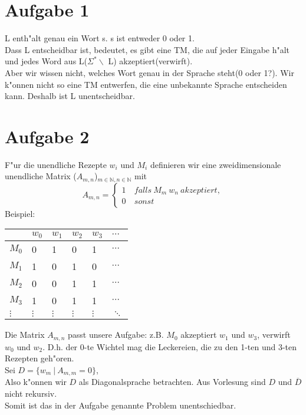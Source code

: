 \documentclass[a4paper,11pt]{scrartcl}
\begin{document}
	
\section*{Aufgabe 1}

L enth"alt genau ein Wort s. s ist entweder 0 oder 1. \\
Dass L entscheidbar ist, bedeutet, es gibt eine TM, die auf jeder Eingabe h"alt und jedes Word aus L($\Sigma ^* \backslash $ L) akzeptiert(verwirft).\\
Aber wir wissen nicht, welches Wort genau in der Sprache steht(0 oder 1?). Wir k"onnen nicht so eine TM entwerfen, die eine unbekannte Sprache entscheiden kann. Deshalb ist L unentscheidbar.

\section*{Aufgabe 2}

F"ur die unendliche Rezepte $w_i$ und $M_i$ definieren wir eine zweidimensionale unendliche Matrix ($A_{m,n}$)$_{m\in \mathbb{N},n\in \mathbb{N}}$ mit
$$ A_{m,n}=\left\{
\begin{aligned}
1 &\ falls\ M_m\ w_n\ akzeptiert,\\
0 &\ sonst
\end{aligned}
\right.
$$
Beispiel:
\begin{table}[h]
	\begin{tabular}{l|lllll}
		& $w_0$ & $w_1$   & $w_2$   & $w_3$   & $\cdots$ \\ \hline
		$M_0$   & 0       & 1       & 0       & 1       & $\cdots$ \\
		$M_1$   & 1       & 0       & 1       & 0       & $\cdots$ \\
		$M_2$   & 0       & 0       & 1       & 1       & $\cdots$ \\
		$M_3$   & 1       & 0       & 1       & 1       & $\cdots$ \\
		$\vdots$ & $\vdots$ & $\vdots$ & $\vdots$ & $\vdots$ & $\ddots$ 
	\end{tabular}
\end{table}

Die Matrix $A_{m,n}$ passt unsere Aufgabe: z.B. $M_0$ akzeptiert $w_1$ und $w_3$, verwirft $w_0$ und $w_2$. D.h. der 0-te Wichtel mag die Leckereien, die zu den 1-ten und 3-ten Rezepten geh"oren. \\
Sei $D = \{ w_m\ |\ A_{m,m} = 0\}$,\\
Also k"onnen wir $D$ als Diagonalsprache betrachten. Aus Vorlesung sind $D$ und $\overline{D}$ nicht rekursiv.\\
Somit ist das in der Aufgabe genannte Problem unentschiedbar.
\end{document}
